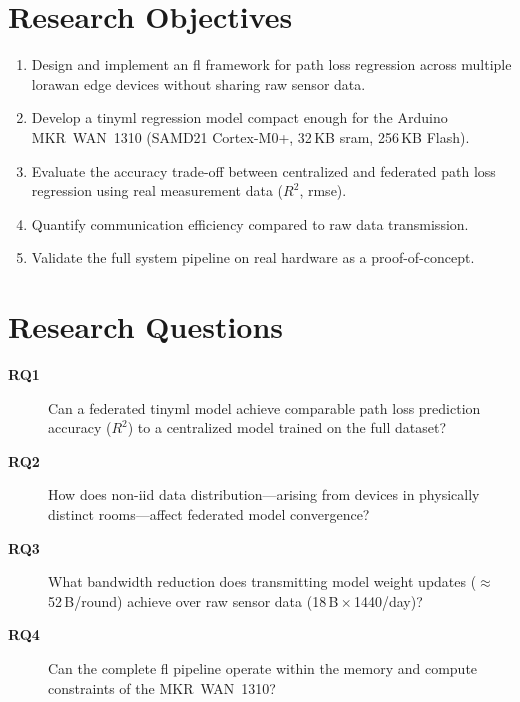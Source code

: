 \documentclass[12pt, a4paper, twoside, openright]{report}
\begin{document}
\section{Research Objectives}
\label{sec:objectives}
\begin{enumerate}
  \item Design and implement an \gls{fl} framework for path loss regression across multiple \gls{lorawan} edge devices without sharing raw sensor data.
  \item Develop a \gls{tinyml} regression model compact enough for the Arduino MKR~WAN~1310 (SAMD21 Cortex-M0+, 32\,KB \gls{sram}, 256\,KB Flash).
  \item Evaluate the accuracy trade-off between centralized and federated path loss regression using real measurement data ($R^2$, \gls{rmse}).
  \item Quantify communication efficiency compared to raw data transmission.
  \item Validate the full system pipeline on real hardware as a proof-of-concept.
\end{enumerate}

\section{Research Questions}
\label{sec:research-questions}
\begin{description}
  \item[\textbf{RQ1}] Can a federated \gls{tinyml} model achieve comparable path loss prediction accuracy ($R^2$) to a centralized model trained on the full dataset?
  \item[\textbf{RQ2}] How does non-\gls{iid} data distribution---arising from devices in physically distinct rooms---affect federated model convergence?
  \item[\textbf{RQ3}] What bandwidth reduction does transmitting model weight updates ($\approx$\,52\,B/round) achieve over raw sensor data (18\,B\,$\times$\,1440/day)?
  \item[\textbf{RQ4}] Can the complete \gls{fl} pipeline operate within the memory and compute constraints of the MKR~WAN~1310?
\end{description}
\end{document}
